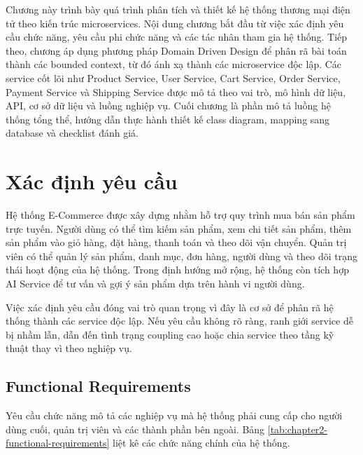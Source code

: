 \documentclass[../main.tex]{subfiles}
\begin{document}
Chương này trình bày quá trình phân tích và thiết kế hệ thống thương mại điện tử theo kiến trúc microservices. Nội dung chương bắt đầu từ việc xác định yêu cầu chức năng, yêu cầu phi chức năng và các tác nhân tham gia hệ thống. Tiếp theo, chương áp dụng phương pháp Domain Driven Design để phân rã bài toán thành các bounded context, từ đó ánh xạ thành các microservice độc lập. Các service cốt lõi như Product Service, User Service, Cart Service, Order Service, Payment Service và Shipping Service được mô tả theo vai trò, mô hình dữ liệu, API, cơ sở dữ liệu và luồng nghiệp vụ. Cuối chương là phần mô tả luồng hệ thống tổng thể, hướng dẫn thực hành thiết kế class diagram, mapping sang database và checklist đánh giá.

\section{Xác định yêu cầu}
\label{section:2.1}

Hệ thống E-Commerce được xây dựng nhằm hỗ trợ quy trình mua bán sản phẩm trực tuyến. Người dùng có thể tìm kiếm sản phẩm, xem chi tiết sản phẩm, thêm sản phẩm vào giỏ hàng, đặt hàng, thanh toán và theo dõi vận chuyển. Quản trị viên có thể quản lý sản phẩm, danh mục, đơn hàng, người dùng và theo dõi trạng thái hoạt động của hệ thống. Trong định hướng mở rộng, hệ thống còn tích hợp AI Service để tư vấn và gợi ý sản phẩm dựa trên hành vi người dùng.

Việc xác định yêu cầu đóng vai trò quan trọng vì đây là cơ sở để phân rã hệ thống thành các service độc lập. Nếu yêu cầu không rõ ràng, ranh giới service dễ bị nhầm lẫn, dẫn đến tình trạng coupling cao hoặc chia service theo tầng kỹ thuật thay vì theo nghiệp vụ.

\subsection{Functional Requirements}
\label{subsection:2.1.1}

Yêu cầu chức năng mô tả các nghiệp vụ mà hệ thống phải cung cấp cho người dùng cuối, quản trị viên và các thành phần bên ngoài. Bảng \ref{tab:chapter2-functional-requirements} liệt kê các chức năng chính của hệ thống.
\end{document}
